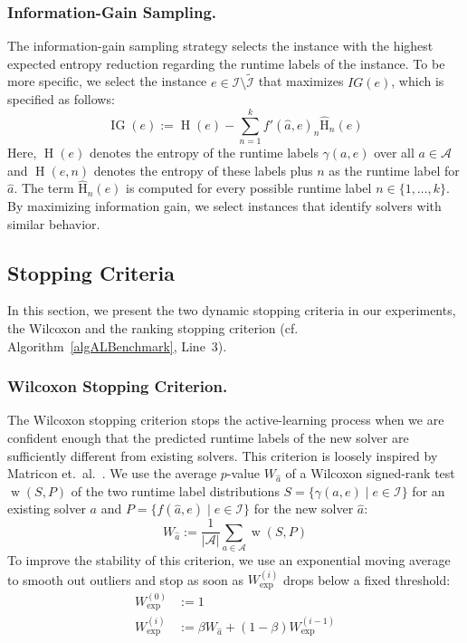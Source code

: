 \documentclass[runningheads]{llncs}
\begin{document}
\subsubsection{Information-Gain Sampling.}

The information-gain sampling strategy selects the instance with the highest expected entropy reduction regarding the runtime labels of the instance.
To be more specific, we select the instance $e \in \mathcal{I} \setminus \tilde{\mathcal{I}}$ that maximizes $IG(e)$, which is specified as follows:
%
\begin{equation*}
  \operatorname{IG}(e) := \operatorname{H}(e) - \sum_{n = 1}^{k} f'(\hat{a}, e)_{n} \operatorname{\hat H}_n(e)
\end{equation*}
%
Here, $\operatorname{H}(e)$ denotes the entropy of the runtime labels $\gamma(a, e)$ over all $a \in \mathcal{A}$ and $\operatorname{H}(e, n)$ denotes the entropy of these labels plus $n$ as the runtime label for $\hat{a}$.
The term $\operatorname{\hat H}_n(e)$ is computed for every possible runtime label $n \in \{1, \dots, k\}$.
By maximizing information gain, we select instances that identify solvers with similar behavior.

\subsection{Stopping Criteria}
\label{sec:main:stopping}

In this section, we present the two dynamic stopping criteria in our experiments, the Wilcoxon and the ranking stopping criterion (cf. Algorithm~\ref{algALBenchmark}, Line~3).

\subsubsection{Wilcoxon Stopping Criterion.}

The Wilcoxon stopping criterion stops the active-learning process when we are confident enough that the predicted runtime labels of the new solver are sufficiently different from existing solvers.
This criterion is loosely inspired by Matricon et.~al.~\cite{MatriconAFSH21}.
We use the average $p$-value $W_{\hat{a}}$ of a Wilcoxon signed-rank test $\operatorname{w}(S,P)$ of the two runtime label distributions $S=\{ \gamma(a, e) \mid e \in \mathcal{I} \}$ for an existing solver $a$ and \mbox{$P=\{ f(\hat a, e) \mid e \in \mathcal{I} \}$} for the new solver $\hat{a}$:
%
\begin{equation*}
  W_{\hat{a}} := \frac{1}{\lvert \mathcal{A} \rvert} \sum_{a \in \mathcal{A}} \operatorname{w}(S, P)
\end{equation*}
%
To improve the stability of this criterion, we use an exponential moving average to smooth out outliers and stop as soon as $W^{(i)}_{\exp}$ drops below a fixed threshold:
%
\begin{align*}
  W_{\exp}^{\left(0\right)} &:= 1\\
  W_{\exp}^{\left(i\right)} &:= \beta W_{\hat{a}} + \left(1 - \beta\right) W_{\exp}^{\left(i - 1\right)}
\end{align*}
\end{document}
